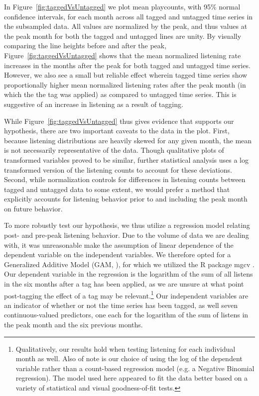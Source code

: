 In Figure~\ref{fig:taggedVsUntagged} we plot mean playcounts, with 95\% normal confidence intervals, for each month across all tagged and untagged time series in the subsampled data. All values are normalized by the peak, and thus values at the peak month for both the tagged and untagged lines are unity. By visually comparing the line heights before and after the peak, Figure~\ref{fig:taggedVsUntagged} shows that the mean normalized listening rate increases in the months after the peak for both tagged and untagged time series. However, we also see a small but reliable effect wherein tagged time series show proportionally higher mean normalized listening rates after the peak month (in which the the tag was applied) as compared to untagged time series. This is suggestive of an increase in listening as a result of tagging.

While Figure~\ref{fig:taggedVsUntagged} thus gives evidence that supports our hypothesis, there are two important caveats to the data in the plot. First, because listening distributions are heavily skewed for any given month, the mean is not necessarily representative of the data. Though qualitative plots of transformed variables proved to be similar, further statistical analysis uses a log transformed version of the listening counts to account for these deviations. Second, while normalization controls for differences in listening counts between tagged and untagged data to some extent, we would prefer a method that explicitly accounts for listening behavior prior to and including the peak month on future behavior.

To more robustly test our hypothesis, we thus utilize a regression model relating post- and pre-peak listening behavior. Due to the volume of data we are dealing with, it was unreasonable make the assumption of linear dependence of the dependent variable on the independent variables. We therefore opted for a Generalized Additive Model (GAM, \cite{hastie1990generalized}), for which we utilized the R package mgcv \cite{wood2001mgcv}.
Our dependent variable in the regression is the logarithm of the sum of all listens in the six months after a tag has been applied, as we are unsure at what point post-tagging the effect of a tag may be relevant.\footnote{Qualitatively, our results hold when testing listening for each individual month as well. Also of note is our choice of using the log of the dependent variable rather than a count-based regression model (e.g. a Negative Binomial regression). The model used here appeared to fit the data better based on a variety of statistical and visual goodness-of-fit tests.} Our independent variables are an indicator of whether or not the time series has been tagged, as well seven continuous-valued predictors, one each for the logarithm of the sum of listens in the peak month and the six previous months.   

